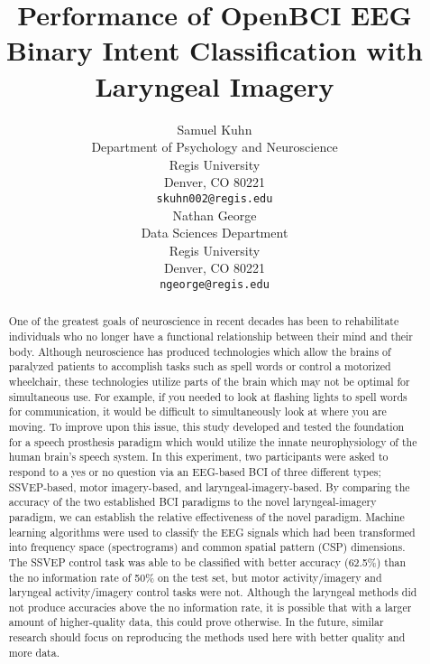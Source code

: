 \documentclass{article}
\title{Performance of OpenBCI EEG Binary Intent Classification with Laryngeal Imagery}
\author{Samuel Kuhn \\
	Department of Psychology and Neuroscience\\
	Regis University\\
	Denver, CO 80221 \\
	\texttt{skuhn002@regis.edu} \\
	\And
	Nathan George \\
	Data Sciences Department\\
	Regis University\\
	Denver, CO 80221\\
	\texttt{ngeorge@regis.edu} \\
}
\begin{document}
\maketitle

\begin{abstract}
One of the greatest goals of neuroscience in recent decades has been to rehabilitate individuals who no longer have a functional relationship between their mind and their body. Although neuroscience has produced technologies which allow the brains of paralyzed patients to accomplish tasks such as spell words or control a motorized wheelchair, these technologies utilize parts of the brain which may not be optimal for simultaneous use. For example, if you needed to look at flashing lights to spell words for communication, it would be difficult to simultaneously look at where you are moving. To improve upon this issue, this study developed and tested the foundation for a speech prosthesis paradigm which would utilize the innate neurophysiology of the human brain's speech system. In this experiment, two participants were asked to respond to a yes or no question via an EEG-based BCI of three different types; SSVEP-based, motor imagery-based, and laryngeal-imagery-based. By comparing the accuracy of the two established BCI paradigms to the novel laryngeal-imagery paradigm, we can establish the relative effectiveness of the novel paradigm. Machine learning algorithms were used to classify the EEG signals which had been transformed into frequency space (spectrograms) and common spatial pattern (CSP) dimensions. The SSVEP control task was able to be classified with better accuracy (62.5\%) than the no information rate of 50\% on the test set, but motor activity/imagery and laryngeal activity/imagery control tasks were not. Although the laryngeal methods did not produce accuracies above the no information rate, it is possible that with a larger amount of higher-quality data, this could prove otherwise. In the future, similar research should focus on reproducing the methods used here with better quality and more data.
\end{abstract}


\end{document}
